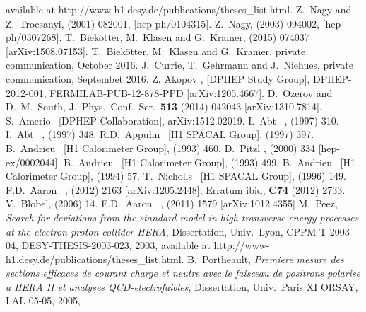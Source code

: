 \documentclass[12pt]{article}
\begin{document}
\begin{flushleft}
\begin{thebibliography}{99}
available at http://www-h1.desy.de/publications/theses\_list.html.
%
 Z.~Nagy and Z.~Trocsanyi,  (2001) 082001, [hep-ph/0104315].
 Z.~Nagy,  (2003) 094002, [hep-ph/0307268].
%
 T.~Biek\"otter, M.~Klasen and G.~Kramer,  (2015) 074037 [arXiv:1508.07153].
%
 T.~Biek\"otter, M.~Klasen and G.~Kramer, private communication, October 2016.
%
  J.~Currie, T.~Gehrmann and J.~Niehues, private communication, Septembet 2016.
%
 Z. Akopov \etal,  {[DPHEP Study Group]}, DPHEP-2012-001, FERMILAB-PUB-12-878-PPD [arXiv:1205.4667].
%
  D.~Ozerov and D.~M.~South,
  J.\ Phys.\ Conf.\ Ser.\  {\bf 513} (2014) 042043
  [arXiv:1310.7814].
%
  S.~Amerio \etal\ [DPHEP Collaboration],
  arXiv:1512.02019.
%
 I.~Abt \etal\ \Hone,  (1997) 310.
 I.~Abt \etal\ \Hone,  (1997) 348.
 R.D.~Appuhn \etal\ {[H1 SPACAL Group]},  (1997) 397.
 B.~Andrieu \etal\ {[H1 Calorimeter Group]},  (1993) 460.
%
  D.~Pitzl \etal,  (2000) 334 [hep-ex/0002044].
%
 B.~Andrieu \etal\ [H1 Calorimeter Group],  (1993) 499.
 B.~Andrieu \etal\ [H1 Calorimeter Group],  (1994) 57.
 T.~Nicholls \etal\ {[H1 SPACAL Group]},  (1996) 149.
 F.D.~Aaron \etal\ \Hone,  (2012) 2163 [arXiv:1205.2448]; Erratum ibid, {\bf C74} (2012) 2733.
%
 V.~Blobel,  (2006) 14.
%
 F.D.~Aaron \etal\ \Hone,  (2011) 1579 [arXiv:1012.4355]
%
 M.~Peez, \emph{Search for deviations from the standard model in high transverse energy processes at the electron proton collider HERA}, Dissertation, Univ.~Lyon, CPPM-T-2003-04, DESY-THESIS-2003-023, 2003,
available at http://www-h1.desy.de/publications/theses\_list.html.
%
 B.~Portheault, \emph{Premiere mesure des sections efficaces de courant charge et neutre avec le faisceau de positrons polarise a HERA II et analyses QCD-electrofaibles}, Dissertation, Univ.~Paris XI ORSAY, LAL 05-05, 2005,

\end{thebibliography}
\end{flushleft}
\end{document}
